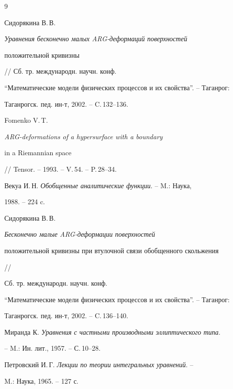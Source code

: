 \begin{thebibliography}{9}







Сидорякина В.\,В. {\em Уравнения бесконечно малых ARG-деформаций поверхностей


положительной кривизны} // Сб. тр. международн. научн. конф.


``Математические модели физических процессов и их свойства''. -- Таганрог: 


Таганрогск. пед. ин-т, 2002. -- C.\,132--136.




Fomenko V.\,T. {\em ARG-deformations of a hypersurface with a boundary


in a Riemannian space} // Tensor. -- 1993. -- V.\,54. -- P.\,28--34.




Векуа И.\,Н. {\em Обобщенные аналитические функции}. -- M.: Наука,


1988. -- 224 c.




Сидорякина В.\,В. {\em Бесконечно малые ARG-деформации поверхностей 


положительной кривизны при втулочной связи обобщенного скольжения} // 


Сб. тр. международн. научн. конф.


``Математические модели физических процессов и их свойства''. -- Таганрог: 


Таганрогск. пед. ин-т, 2002. -- C.\,136--140.




Миранда К. {\em Уравнения с частными производными эллиптического типа}.


-- M.: Ин. лит., 1957. -- С.\,10--28.




Петровский И.\,Г. {\em Лекции по теории интегральных уравнений}. --


M.: Наука, 1965. -- 127 с.





\end{thebibliography}





\vskip 2cm












\label{end}














